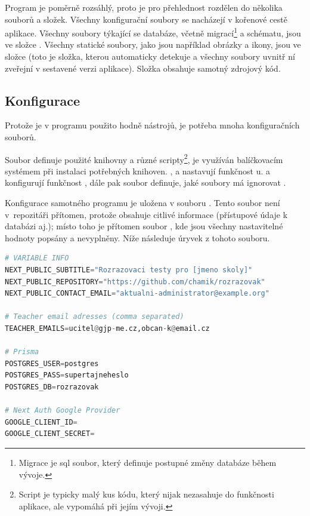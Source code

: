 Program je poměrně rozsáhlý, proto je pro přehlednost rozdělen do několika souborů a složek. Všechny konfigurační soubory se nacházejí v kořenové cestě aplikace. Všechny soubory týkající se databáze, včetně migrací\footnote{Migrace je sql soubor, který definuje postupné změny databáze během vývoje.} a schématu, jsou ve složce . Všechny statické soubory, jako jsou například obrázky a ikony, jsou ve složce  (toto je složka, kterou  automaticky detekuje a všechny soubory uvnitř ní zveřejní v sestavené verzi aplikace). Složka  obsahuje samotný zdrojový kód.

\subsection{Konfigurace}
\label{sec:config}

Protože je v programu použito hodně nástrojů, je potřeba mnoha konfiguračních souborů.

Soubor  definuje použité knihovny a různé scripty\footnote{Script je typicky malý kus kódu, který nijak nezasahuje do funkčnosti aplikace, ale vypomáhá při jejím vývoji.}, je využíván balíčkovacím systémem  při instalaci potřebných knihoven. ,  a  nastavují funkčnost u.  a  konfigurují funkčnost , dále pak soubor  definuje, jaké soubory má ignorovat .

Konfigurace samotného programu je uložena v souboru . Tento soubor není v~repozitáři přítomen, protože obsahuje citlivé informace (přístupové údaje k databázi aj.); místo toho je přítomen soubor , kde jsou všechny nastavitelné hodnoty popsány a nevyplněny. Níže následuje úryvek z tohoto souboru.

\begin{lstlisting}[language=Python,caption={Úryvek \M{/.env}; ukázka konfiguračního souboru programu.}]
# VARIABLE INFO
NEXT_PUBLIC_SUBTITLE="Rozrazovaci testy pro [jmeno skoly]"
NEXT_PUBLIC_REPOSITORY="https://github.com/chamik/rozrazovak"
NEXT_PUBLIC_CONTACT_EMAIL="aktualni-administrator@example.org"

# Teacher email adresses (comma separated)
TEACHER_EMAILS=ucitel@gjp-me.cz,obcan-k@email.cz

# Prisma
POSTGRES_USER=postgres
POSTGRES_PASS=supertajneheslo
POSTGRES_DB=rozrazovak

# Next Auth Google Provider
GOOGLE_CLIENT_ID=
GOOGLE_CLIENT_SECRET=
\end{lstlisting}

